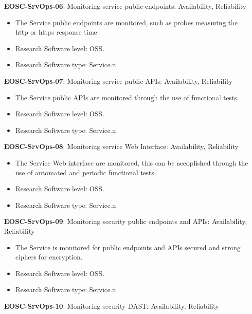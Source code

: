 \textbf{EOSC-SrvOps-06}: Monitoring service public endpoints: Availability, Reliability

\begin{itemize}
    \item The Service public endpoints are monitored, such as probes measuring the http or https response time \cite{orviz_fernandez_eosc-synergy_2020}
    \item Research Software level: OSS.
    \item Research Software type: Service.n\end{itemize}

\textbf{EOSC-SrvOps-07}: Monitoring service public APIs: Availability, Reliability

\begin{itemize}
    \item The Service public APIs are monitored through the use of functional tests. \cite{orviz_fernandez_eosc-synergy_2020}
    \item Research Software level: OSS.
    \item Research Software type: Service.n\end{itemize}

\textbf{EOSC-SrvOps-08}: Monitoring service Web Interface: Availability, Reliability

\begin{itemize}
    \item The Service Web interface are monitored, this can be accoplished through the use of automated and periodic functional tests. \cite{orviz_fernandez_eosc-synergy_2020}
    \item Research Software level: OSS.
    \item Research Software type: Service.n\end{itemize}

\textbf{EOSC-SrvOps-09}: Monitoring security public endpoints and APIs: Availability, Reliability

\begin{itemize}
    \item The Service is monitored for public endpoints and APIs secured and strong ciphers for encryption. \cite{orviz_fernandez_eosc-synergy_2020}
    \item Research Software level: OSS.
    \item Research Software type: Service.n\end{itemize}

\textbf{EOSC-SrvOps-10}: Monitoring security DAST: Availability, Reliability

